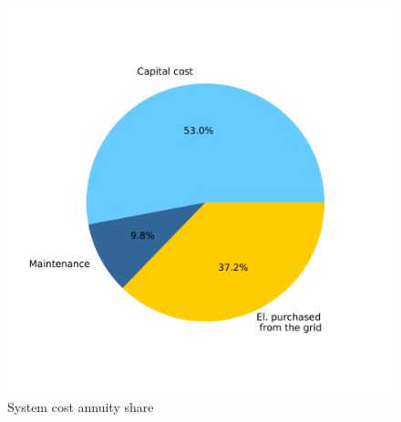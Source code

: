 \documentclass[english]{SPFShortReport}
\begin{document}
\begin{figure}[!htbp]
\begin{center}
\includegraphics[width=1\textwidth]{costShareAnnuity-HydD_mfb30_real_dryN-CityBAS_dryNAc1.0x58.086Vice0.2x58.086HP1.0x18.442-Year0.pdf}
\caption{System cost annuity share}
\label{systemCostannuity}
\end{center}
\end{figure}
\end{document}
